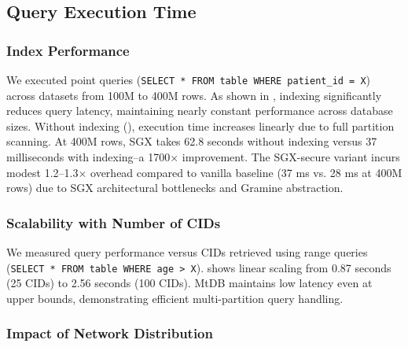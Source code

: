 \documentclass[conference]{IEEEtran}
\newcommand{\ours}{\xspace MtDB\xspace}
\begin{document}

\subsection{Query Execution Time}

\subsubsection{Index Performance}

We executed point queries (\lstinline{SELECT * FROM table WHERE patient_id = X}) across datasets from 100M to 400M rows. As shown in , indexing significantly reduces query latency, maintaining nearly constant performance across database sizes. Without indexing (), execution time increases linearly due to full partition scanning. At 400M rows, SGX takes 62.8 seconds without indexing versus 37 milliseconds with indexing--a 1700$\times$ improvement. The SGX-secure variant incurs modest 1.2--1.3$\times$ overhead compared to vanilla baseline (37 ms vs. 28 ms at 400M rows) due to SGX architectural bottlenecks and Gramine abstraction.

\subsubsection{Scalability with Number of CIDs}

We measured query performance versus CIDs retrieved using range queries (\lstinline{SELECT * FROM table WHERE age > X}).  shows linear scaling from 0.87 seconds (25 CIDs) to 2.56 seconds (100 CIDs). \ours maintains low latency even at upper bounds, demonstrating efficient multi-partition query handling.

\subsubsection{Impact of Network Distribution}
\end{document}
